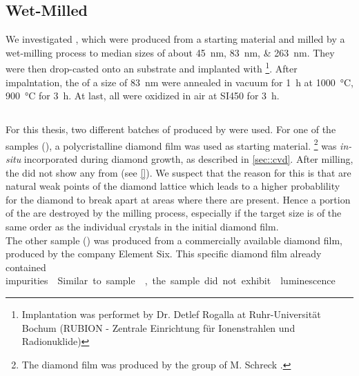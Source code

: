 	\subsection{Wet-Milled \HPHT \Nds}\label{subsec::hpht_nds}
	We investigated \nds, which were produced from a \HPHT starting material and milled by a wet-milling process to median sizes of about \SIlist{45;83;263}{nm}.
	They were then drop-casted onto an \ir substrate and implanted with   \footnote{Implantation was performet by Dr. Detlef Rogalla at Ruhr-Universität Bochum (RUBION - Zentrale Einrichtung für Ionenstrahlen und Radionuklide)}.
	After impalntation, the \nds of a size of \SI{83}{nm} were annealed in vacuum for \SI{1}{\hour} at \SI{1000}{\celsius}, \SI{900}{\celsius} for \SI{3}{\hour}.
	At last, all \HPHT \nds were oxidized in air at SI{450}{\celsius} for \SI{3}{\hour}.
	\\


	\subsection{\BASD \Nds}\label{subsec::basd_nds}
	For this thesis, two different batches of \nds produced by \basd were used.
	For one of the samples (\basds), a polycristalline diamond film was used as starting material.
	\footnote{The diamond film was produced by the group of M. Schreck \cite{}.}
	\Si was \textit{in-situ} incorporated during diamond growth, as described in \autoref{sec::cvd}.
	After milling, the \nds did not show any \pl from \sivs (see \autoref{}).
	We suspect that the reason for this is that \sivs are natural weak points of the diamond lattice which leads to a higher probablility for the diamond to break apart at areas where there are \sivs present.
	Hence a portion of the \sivs are destroyed by the milling process, especially if the target \nd size is of the same order as the individual crystals in the initial diamond film.
	\\
	The other sample (\basdes) was produced from a commercially available diamond film, produced by the company Element Six.
	This specific diamond film already contained \si impurities.
	Similar to sample \basds, the sample did not exhibit \siv luminescence.
	\\
